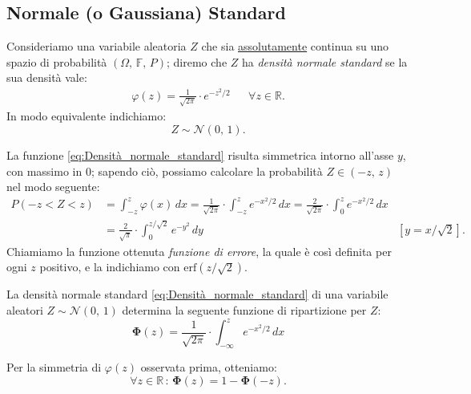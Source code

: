         \subsection{Normale (o Gaussiana) Standard}
            \begin{defn}
                Consideriamo una variabile aleatoria $Z$ che sia \underline{assolutamente} continua su uno spazio di probabilità $(\Omega,\,\mathbb{F},\,P)$; diremo che $Z$ ha \textit{densità normale standard} se la sua densità vale:
                \begin{align}\label{eq:Densità_normale_standard} 
                    \varphi(z) = \frac{1}{\sqrt{2\pi}} \cdot e^{-z^2/2} & &\forall z \in \mathbb{R}
                .\end{align}
                In modo equivalente indichiamo: \[
                    Z \sim \mathcal{N}(0,\, 1)
                .\] 
            \end{defn}
            \begin{obsv}
                La funzione \eqref{eq:Densità_normale_standard} risulta simmetrica intorno all'asse $y$, con massimo in 0; sapendo ciò, possiamo calcolare la probabilità $Z \in (-z,\, z)$ nel modo seguente:
                \begin{align*}
                    P(-z < Z < z) &= \int_{-z}^{z} \varphi(x)\, dx = \frac{1}{\sqrt{2\pi}} \cdot \int_{-z}^{z} e^{-x^2/2}\, dx = \frac{2}{\sqrt{2\pi}} \cdot \int_{0}^{z} e^{-x^2/2}\, dx \\
                                  &= \frac{2}{\sqrt{\pi}} \cdot \int_{0}^{z /\sqrt{2}} e^{-y^2}\, dy & [y = x /\sqrt{2}] 
                .\end{align*}
                Chiamiamo la funzione ottenuta \textit{funzione di errore}, la quale è così definita per ogni $z$ positivo, e la indichiamo con $\text{erf}(z /\sqrt{2})$.
            \end{obsv}
            \begin{prty}
                La densità normale standard \eqref{eq:Densità_normale_standard} di una variabile aleatori $Z \sim \mathcal{N}(0,\,1)$ determina la seguente funzione di ripartizione per $Z$:
                \begin{equation}\label{eq:Ripartizione_normale_standard}
                    \mathbf{\Phi}(z) = \frac{1}{\sqrt{2\pi}} \cdot \int_{-\infty}^{z} e^{-x^2 /2}\, dx
                \end{equation}
            \end{prty}
            \begin{obsv}
                Per la simmetria di $\varphi(z)$ osservata prima, otteniamo: \[
                    \forall z \in \mathbb{R} \,:\, \mathbf{\Phi}(z) = 1 - \mathbf{\Phi}(-z)
                .\] 
            \end{obsv}
